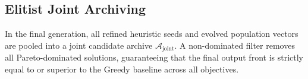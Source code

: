 \subsection{Elitist Joint Archiving}
In the final generation, all refined heuristic seeds and evolved population vectors are pooled into a joint candidate archive $\mathcal{A}_{\text{joint}}$. A non-dominated filter removes all Pareto-dominated solutions, guaranteeing that the final output front is strictly equal to or superior to the Greedy baseline across all objectives.

